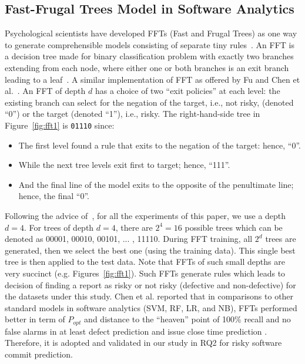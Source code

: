 \documentclass[sigconf,review, anonymous]{acmart}
\newcommand{\bi}{\begin{itemize}[leftmargin=0.4cm]}
\newcommand{\ei}{\end{itemize}}
\begin{document}
\subsection{Fast-Frugal Trees Model in Software Analytics}

Psychological scientists have developed FFTs (Fast and Frugal Trees) as one way to generate comprehensible models consisting of separate tiny rules~\cite{phillips2017fftrees,di18_fft,martignon2008categorization,agrawal18_fft,agrawal2019dodge}. An FFT is a decision tree made for binary classification problem with exactly two branches extending from each node, where either one or both branches is an exit branch leading to a leaf~\cite{martignon2008categorization}. 
 A similar implementation of FFT as offered by Fu and Chen et al.~\cite{fu2018building,di18_fft}. 
An FFT of depth $d$ has a choice of two ``exit policies'' at each level: the existing branch can select for the negation of the target, i.e., not risky, (denoted ``0'') or the target (denoted ``1''), i.e., risky.
The right-hand-side tree in Figure~\ref{fig:fft1} is \texttt{01110} since:
\bi
\item
The first level found a rule that exits to the negation of the target: hence, ``0''.
\item
While the next tree levels exit first to target; hence, ``111''.
\item
And the final line of the model exits
to the opposite of the penultimate line; hence, the final ``0''.
\ei



Following the advice of~\cite{fu2018building,di18_fft,phillips2017fftrees}, for all the experiments of this paper, we use a depth    $d=4$. 
For trees of depth $d=4$, there are $2^4=16$ possible trees which can be denoted as 00001, 00010, 00101, ... , 11110. During FFT training, all $2^d$ trees are generated, then we select the best one (using the training data).
 This single best tree is then applied to the test data.
 Note that FFTs of such small
depths are very succinct
(e.g. Figures~\ref{fig:fft1}). Such FFTs generate rules which leads to decision of finding a report as risky or not risky (defective and non-defective) for the datasets under this study. Chen et al. reported that in comparisons to other standard models in software analytics (SVM, RF, LR, and NB), FFTs performed better in term of $P_{opt}$ and distance to the ``heaven'' point of 100\% recall and no false alarms in at least defect prediction and issue close time prediction  \cite{di18_fft}. Therefore, it is adopted and validated in our study in RQ2 for risky software commit prediction. 
\end{document}
